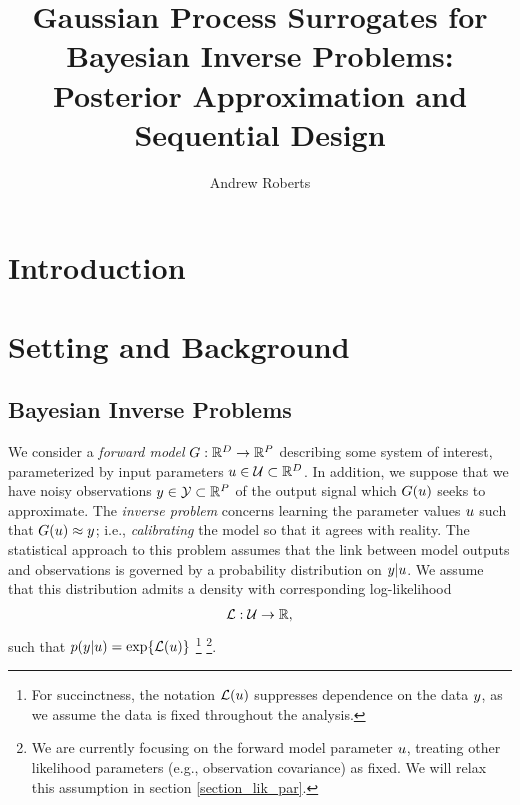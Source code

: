 \documentclass[12pt]{article}
\title{Gaussian Process Surrogates for Bayesian Inverse Problems: Posterior Approximation and Sequential Design}
\author{Andrew Roberts}
\begin{document}
\maketitle


\section{Introduction}

\section{Setting and Background}

\subsection{Bayesian Inverse Problems}
We consider a \textit{forward model} $G: \mathbb{R}^{D} \to \mathbb{R}^{P}$ describing some system of interest, parameterized by 
input parameters $u \in \mathcal{U} \subset \mathbb{R}^{D}$. In addition, we suppose that we have noisy observations 
$y \in \mathcal{Y} \subset \mathbb{R}^{P}$ of the output signal which $G(u)$ seeks to approximate. The 
\textit{inverse problem} concerns learning the parameter values $u$ such that $G(u) \approx y$; i.e., \textit{calibrating}
the model so that it agrees with reality. The statistical approach to this problem assumes that the link between model outputs and 
observations is governed by a probability distribution on  $y | u$. We assume that this distribution admits a density 
with corresponding log-likelihood 
\begin{align}
\mathcal{L}: \mathcal{U} \to \mathbb{R}, \label{log_likelihood}
\end{align}
such that $p(y | u) = \exp\mathopen{}\left\{\mathcal{L}(u)\right\}\mathclose{}$ 
\footnote{For succinctness, the notation $\mathcal{L}(u)$ suppresses dependence on the data $y$, 
as we assume the data is fixed throughout the analysis.}
\footnote{We are currently focusing on the forward model parameter $u$, treating other likelihood 
parameters (e.g., observation covariance) as fixed. We will relax this assumption 
in section \ref{section_lik_par}.}.
\end{document}
